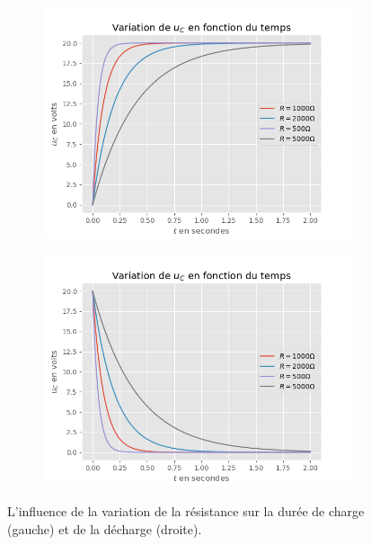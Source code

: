 \documentclass[11pt,a4paper]{article}
\begin{document}
\begin{figure}[H]
\centering
\begin{subfigure}{.49\textwidth}
  \centering
  \includegraphics[width=\linewidth]{imgs/p7/Figure_1.png}  
\end{subfigure}
\begin{subfigure}{.49\textwidth}
  \centering
  \includegraphics[width=\linewidth]{imgs/p7/Figure_2.png}  
\end{subfigure}
\caption{L'influence de la variation de la résistance sur la durée de charge (gauche) et de la décharge (droite).}
\label{fig:tempsresist}
\end{figure}
\end{document}

